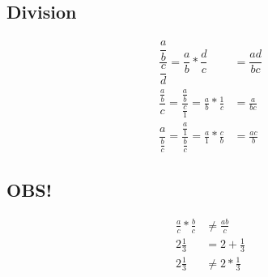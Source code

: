 \subsection{Division}
\begin{align*}
\dfrac{\dfrac{a}{b}}{\dfrac{c}{d}}=\dfrac{a}{b}*\dfrac{d}{c}&=\dfrac{ad}{bc}\\
\dfrac{\frac{a}{b}}{c}=\dfrac{\frac{a}{b}}{\frac{c}{1}}=\frac{a}{b}*\frac{1}{c}&=\frac{a}{bc}\\
\dfrac{a}{\frac{b}{c}}=\dfrac{\frac{a}{1}}{\frac{b}{c}}=\frac{a}{1}*\frac{c}{b}&=\frac{ac}{b}
\end{align*}
\subsection{OBS!}
\begin{align*}
\frac{a}{c}*\frac{b}{c}&\neq\frac{ab}{c}\\
2\frac{1}{3}&=2+\frac{1}{3}\\
2\frac{1}{3}&\neq 2*\frac{1}{3}
\end{align*}